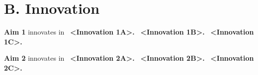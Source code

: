 \documentclass[11pt,letterpaper]{article}
\begin{document}
\section{B. Innovation}

\lipsum[8]

\textbf{Aim 1} innovates in %
\textbullet\ \textbf{<Innovation 1A>.} %
\textbullet\ \textbf{<Innovation 1B>.} %
\textbullet\ \textbf{<Innovation 1C>.} %

\textbf{Aim 2} innovates in %
\textbullet\ \textbf{<Innovation 2A>.} %
\textbullet\ \textbf{<Innovation 2B>.} %
\textbullet\ \textbf{<Innovation 2C>.} %


\printbibliography[title={BIBLIOGRAPHY \& REFERENCES CITED}]
\end{document}
